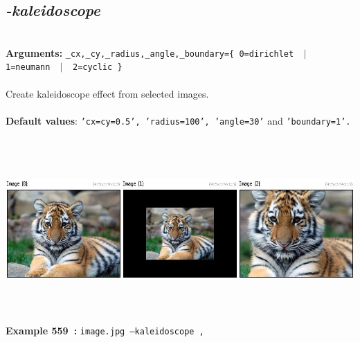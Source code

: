 \documentclass[a4paper,11pt,twoside]{book}
\begin{document}
\subsection{\emph{-kaleidoscope} }\vspace*{-0.5em}
~\\\textbf{Arguments: } 
{\small \texttt{\_cx,\_cy,\_radius,\_angle,\_boundary=\{ 0=dirichlet ~$|$~ 1=neumann ~$|$~ 2=cyclic \}}}\\~\\
Create kaleidoscope effect from selected images.
~\\~\\\textbf{Default values}: {\small \texttt{'cx=cy=0.5', 'radius=100', 'angle=30'} and \texttt{'boundary=1'.}}
\begin{center}\includegraphics[keepaspectratio=true,height=7cm,width=\textwidth]{img/gmic_def559.jpg}\\
{\footnotesize \textbf{Example 559~:} \texttt{image.jpg --kaleidoscope ,}}
\end{center}
\end{document}
